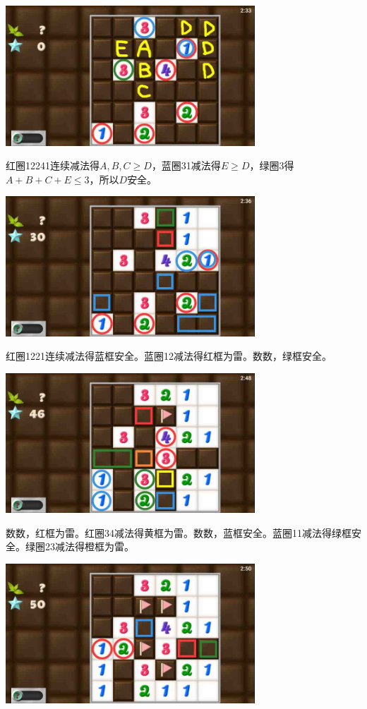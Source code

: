 \subsection{} %
\begin{center}
    \includegraphics[width=0.7\textwidth]{puzzlelow/231-1.jpg}
\end{center}
红圈12241连续减法得$A,B,C\ge D$，蓝圈31减法得$E\ge D$，绿圈3得$A+B+C+E\le 3$，所以$D$安全。
\begin{center}
    \includegraphics[width=0.7\textwidth]{puzzlelow/231-2.jpg}
\end{center}
红圈1221连续减法得蓝框安全。蓝圈12减法得红框为雷。数数，绿框安全。
\begin{center}
    \includegraphics[width=0.7\textwidth]{puzzlelow/231-3.jpg}
\end{center}
数数，红框为雷。红圈34减法得黄框为雷。数数，蓝框安全。蓝圈11减法得绿框安全。绿圈23减法得橙框为雷。
\begin{center}
    \includegraphics[width=0.7\textwidth]{puzzlelow/231-4.jpg}
\end{center}
